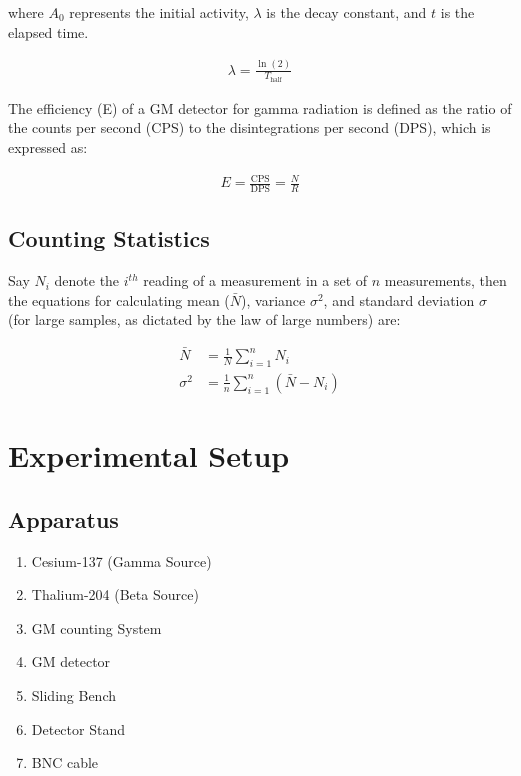 where $A_0$ represents the initial activity, $\lambda$ is the decay constant, and $t$ is the elapsed time. 

\begin{align} \label{half}
    \lambda = \frac{\ln(2)}{T_\text{half}}
\end{align}

The efficiency (E) of a GM detector for gamma radiation is defined as the ratio of the counts per second (CPS) to the disintegrations per second (DPS), which is expressed as:

\begin{align} \label{eff}
    E = \frac{\text{CPS}}{\text{DPS}} = \frac{N}{R}
\end{align}
\subsection{Counting Statistics}

Say $N_i$ denote the $i^{th}$ reading of a measurement in a set of $n$ measurements, then the equations for calculating mean ($\bar{N}$), variance $\sigma^2$, and standard deviation $\sigma$ (for large samples, as dictated by the law of large numbers) are:

\begin{align}\bar{N} &= \frac{1}{N}\sum_{i = 1}^{n} N_i\\
\sigma^2 &= \frac{1}{n} \sum_{i = 1}^{n} (\bar{N} - N_i)\end{align}
\section{Experimental Setup}

\subsection*{Apparatus}

\begin{enumerate}
    \item Cesium-137 (Gamma Source)
    \item Thalium-204 (Beta Source)
    \item GM counting System
    \item GM detector
    \item Sliding Bench
    \item Detector Stand
    \item BNC cable
\end{enumerate}

